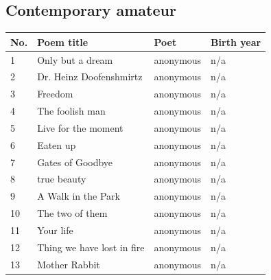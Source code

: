 \documentclass{book}
\begin{document}
\subsection*{Contemporary amateur}
\begin{table}[h!]
\tiny
\begin{tabular}{llll}
\toprule
No. & Poem title & Poet & Birth year \\
\midrule
1 & Only but a dream & anonymous & n/a \\
2 & Dr. Heinz Doofenshmirtz & anonymous & n/a \\
3 & Freedom & anonymous & n/a \\
4 & The foolish man & anonymous & n/a \\
5 & Live for the moment & anonymous & n/a \\
6 & Eaten up & anonymous & n/a \\
7 & Gates of Goodbye & anonymous & n/a \\
8 & true beauty & anonymous & n/a \\
9 & A Walk in the Park & anonymous & n/a \\
10 & The two of them & anonymous & n/a \\
11 & Your life & anonymous & n/a \\
12 & Thing we have lost in fire & anonymous & n/a \\
13 & Mother Rabbit & anonymous & n/a \\
\bottomrule
\end{tabular}
\end{table}
\end{document}
